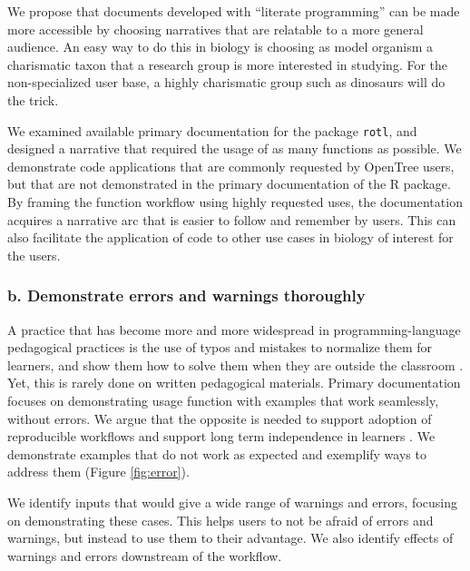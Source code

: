 \documentclass[12pt]{article}
\begin{document}
We propose that documents developed with ``literate programming'' can be made more
accessible by choosing narratives that are relatable to a more general audience.
An easy way to do this in biology is choosing as model organism a charismatic taxon that a
research group is more interested in studying. For the non-specialized user base,
a highly charismatic group such as dinosaurs will do the trick.


We examined available primary documentation for the package \texttt{rotl},
and designed a narrative that required the usage of as many functions as possible.
We demonstrate code applications that are commonly requested by OpenTree users,
but that are not demonstrated in the primary documentation of the R package.
By framing the function workflow using highly requested uses, the documentation acquires a
narrative arc that is easier to follow and remember by users. This can also facilitate
the application of code to other use cases in biology of interest for the users.


\subsubsection*{b. Demonstrate errors and warnings thoroughly}


A practice that has become more and more widespread in programming-language pedagogical practices
is the use of typos and mistakes to normalize them for learners, and show them how
to solve them when they are outside the classroom \citep{shannon2015live}.
Yet, this is rarely done on written pedagogical materials.
Primary documentation focuses on demonstrating usage function with examples that
work seamlessly, without errors. We argue that the opposite is needed to support
adoption of reproducible workflows and support long term independence in learners
\citep{gaspar2007restoring}.
We demonstrate examples that do not work
as expected and exemplify ways to address them (Figure \ref{fig:error}).

We identify inputs that would give
a wide range of warnings and errors, focusing on demonstrating these cases. This
helps users to not be afraid of errors and warnings, but instead to use them to
their advantage.
We also identify effects of warnings and errors downstream of the workflow.
\end{document}
